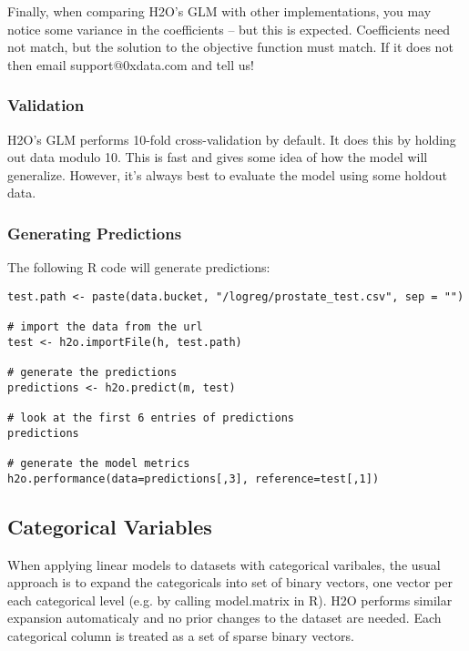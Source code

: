 \documentclass[11pt]{article}
\begin{document}
Finally, when comparing H2O's GLM with other implementations, you may notice some variance in the coefficients -- but this is expected. Coefficients need not match, but the solution to the objective function must match. If it does not then email support@0xdata.com and tell us!
\subsubsection{Validation}

H2O's GLM performs 10-fold cross-validation by default. It does this by holding out data modulo 10. This is fast and gives some idea of how the model will generalize. However, it's always best to evaluate the model using some holdout data.

\subsubsection{Generating Predictions}

The following R code will generate predictions:

\begin{verbatim}
test.path <- paste(data.bucket, "/logreg/prostate_test.csv", sep = "")

# import the data from the url
test <- h2o.importFile(h, test.path)

# generate the predictions
predictions <- h2o.predict(m, test)

# look at the first 6 entries of predictions
predictions

# generate the model metrics
h2o.performance(data=predictions[,3], reference=test[,1])
\end{verbatim}

\subsection{Categorical Variables}
When applying linear models to datasets with categorical varibales, the usual approach is to expand the categoricals into set of binary vectors, one vector per each categorical level (e.g. by calling model.matrix in R). H2O performs similar expansion automaticaly and no prior changes to the dataset are needed. Each categorical column is treated as a set of sparse binary vectors.
\end{document}
